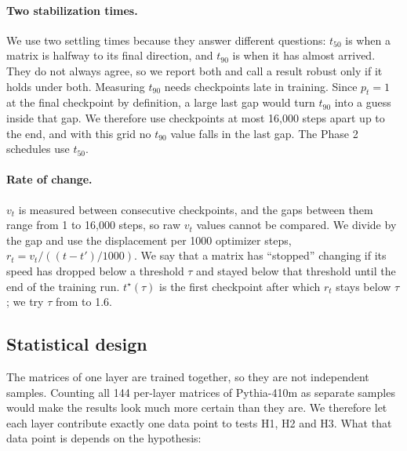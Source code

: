 \documentclass[11pt]{article}
\begin{document}
\paragraph{Two stabilization times.} We use two settling times because they answer different questions: $t_{50}$ is when a matrix is halfway to its final direction, and $t_{90}$ is when it has almost arrived. They do not always agree, so we report both and call a result robust only if it holds under both. Measuring $t_{90}$ needs checkpoints late in training. Since $p_t = 1$ at the final checkpoint by definition, a large last gap would turn $t_{90}$ into a guess inside that gap. We therefore use checkpoints at most 16,000 steps apart up to the end, and with this grid no $t_{90}$ value falls in the last gap. The Phase 2 schedules use $t_{50}$.

\paragraph{Rate of change.} $v_t$ is measured between consecutive checkpoints,
and the gaps between them range from 1 to 16,000 steps, so raw $v_t$ values
cannot be compared. We divide by the gap and use the displacement per 1000
optimizer steps, $r_t = v_t / ((t - t')/1000)$. We say that a matrix has ``stopped'' changing if its speed has dropped below a threshold $\tau$ and stayed below that threshold until the end of the training run. $t^\star(\tau)$ is the first
checkpoint after which $r_t$ stays below $\tau$; we try $\tau$ from \TauMin{}
to 1.6.

\subsection{Statistical design}
\label{sec:stats}

The matrices of one layer are trained together, so they are not independent
samples. Counting all 144 per-layer matrices of Pythia-410m as separate
samples would make the results look much more certain than they are. We
therefore let each layer contribute exactly one data point to tests H1, H2 and H3.
What that data point is depends on the hypothesis:
\end{document}
